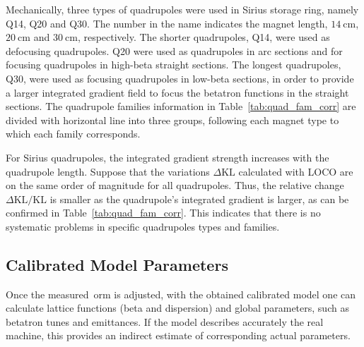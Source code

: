 Mechanically, three types of quadrupoles were used in Sirius storage ring, namely Q14, Q20 and Q30. The number in the name indicates the magnet length, $\SI{14}{\cm}$, $\SI{20}{\cm}$ and $\SI{30}{\cm}$, respectively. The shorter quadrupoles, Q14, were used as defocusing quadrupoles. Q20 were used as quadrupoles in arc sections and for focusing quadrupoles in high-beta straight sections. The longest quadrupoles, Q30, were used as focusing quadrupoles in low-beta sections, in order to provide a larger integrated gradient field to focus the betatron functions in the straight sections. The quadrupole families information in Table~\ref{tab:quad_fam_corr} are divided with horizontal line into three groups, following each magnet type to which each family corresponds. 

For Sirius quadrupoles, the integrated gradient strength increases with the quadrupole length. Suppose that the variations $\Delta \mathrm{KL}$ calculated with LOCO are on the same order of magnitude for all quadrupoles. Thus, the relative change $\Delta \mathrm{KL}/ \mathrm{KL}$ is smaller as the quadrupole's integrated gradient is larger, as can be confirmed in Table~\ref{tab:quad_fam_corr}. This indicates that there is no systematic problems in specific quadrupoles types and families. 

\subsection{Calibrated Model Parameters}
Once the measured~\gls{orm} is adjusted, with the obtained calibrated model one can calculate lattice functions (beta and dispersion) and global parameters, such as betatron tunes and emittances. If the model describes accurately the real machine, this provides an indirect estimate of corresponding actual parameters.

